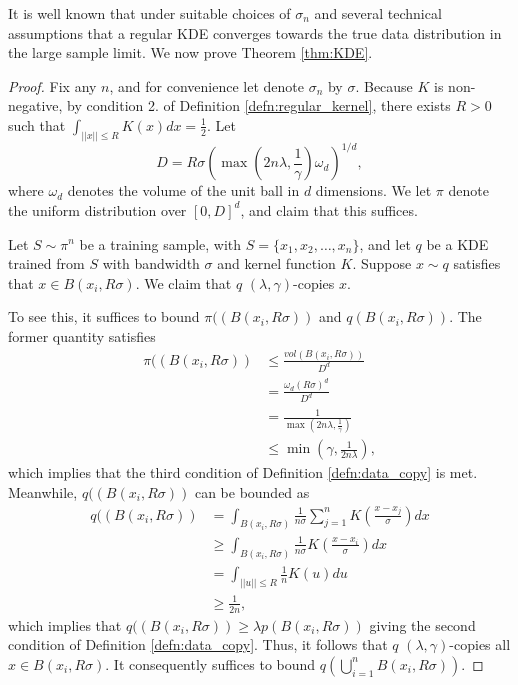 It is well known that under suitable choices of $\sigma_n$ and several technical assumptions that a regular KDE converges towards the true data distribution in the large sample limit. We now prove Theorem \ref{thm:KDE}.

\begin{proof}
Fix any $n$, and for convenience let denote $\sigma_n$ by $\sigma$. Because $K$ is non-negative, by condition 2. of Definition \ref{defn:regular_kernel}, there exists $R > 0$ such that $\int_{||x|| \leq R} K(x)dx = \frac{1}{2}$. Let $$D = R\sigma \left(\max\left(2n\lambda, \frac{1}{\gamma}\right)\omega_d\right)^{1/d},$$ where $\omega_d$ denotes the volume of the unit ball in $d$ dimensions. We let $\pi$ denote the uniform distribution over $[0, D]^d$, and claim that this suffices. 

Let $S \sim \pi^n$ be a training sample, with $S = \{x_1, x_2, \dots, x_n\}$, and let $q$ be a KDE trained from $S$ with bandwidth $\sigma$ and kernel function $K$. Suppose $x \sim q$ satisfies that $x \in B(x_i, R\sigma)$. We claim that $q$ $(\lambda, \gamma)$-copies $x$.

To see this, it suffices to bound $\pi((B(x_i, R\sigma))$ and $q(B(x_i, R\sigma))$. The former quantity satisfies
\begin{equation*}
\begin{split}
\pi((B(x_i, R\sigma)) &\leq \frac{vol(B(x_i, R\sigma))}{D^d} \\
&= \frac{\omega_d(R\sigma)^d}{D^d} \\
&= \frac{1}{\max\left(2n\lambda, \frac{1}{\gamma}\right)} \\ 
&\leq \min\left(\gamma, \frac{1}{2n\lambda}\right),
\end{split}
\end{equation*}
which implies that the third condition of Definition \ref{defn:data_copy} is met. Meanwhile, $q((B(x_i, R\sigma))$ can be bounded as
\begin{equation*}
\begin{split}
q((B(x_i, R\sigma)) &= \int_{B(x_i, R\sigma)} \frac{1}{n\sigma}\sum_{j = 1}^n K \left(\frac{x - x_j}{\sigma} \right)dx \\
&\geq \int_{B(x_i, R\sigma)} \frac{1}{n\sigma}K \left(\frac{x - x_i}{\sigma} \right)dx \\
&= \int_{||u|| \leq R} \frac{1}{n}K(u)du \\
&\geq \frac{1}{2n},
\end{split}
\end{equation*}
which implies that $q((B(x_i, R\sigma)) \geq \lambda p(B(x_i, R\sigma))$ giving the second condition of Definition \ref{defn:data_copy}. Thus, it follows that $q$ $(\lambda,\gamma)$-copies all $x \in B(x_i, R\sigma)$. It consequently suffices to bound $q\left(\bigcup_{i= 1}^n B(x_i, R\sigma)\right)$. 


\end{proof}
